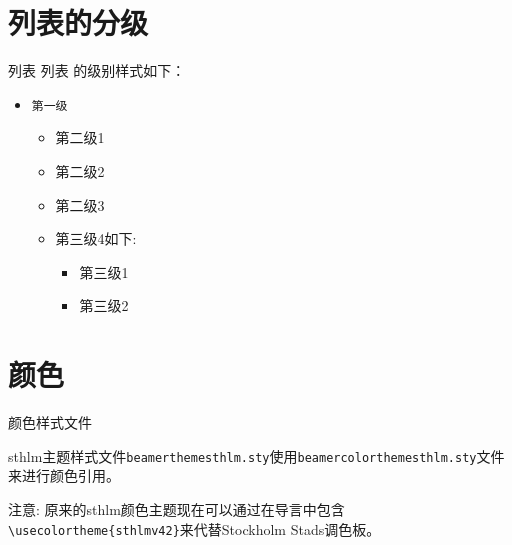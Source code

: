 \documentclass[newPxFont,sthlmFooter]{beamer}
\begin{document}
%
%

\section{列表的分级}


\begin{frame}[c]{列表}
\alert{列表} 的级别样式如下：

\begin{itemize}
	\item \texttt{第一级}
	\begin{itemize}
		\item 第二级1
		\item 第二级2
		\item 第二级3
		\item 第三级4如下:
		\begin{itemize}
			\item 第三级1
			\item 第三级2
		\end{itemize}
	\end{itemize}
\end{itemize}
\end{frame}


%
%
\section{颜色}


\begin{frame}[containsverbatim,c]{颜色样式文件}

	sthlm主题样式文件\texttt{beamerthemesthlm.sty}使用\texttt{beamercolorthemesthlm.sty}文件来进行颜色引用。

\vspace{1em}

\begin{block}{注意:}
	原来的sthlm颜色主题现在可以通过在导言中包含\newline \lstinline!\usecolortheme{sthlmv42}!来代替Stockholm Stads调色板。
\end{block}

\end{frame}
\end{document}
